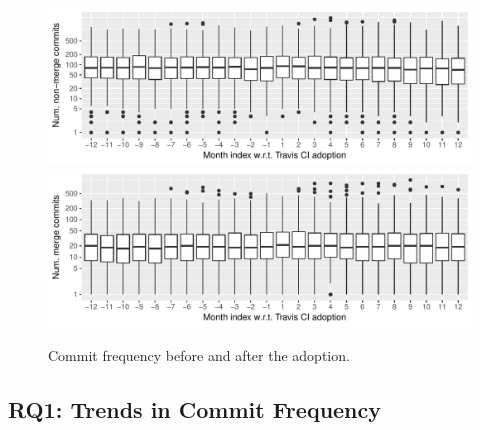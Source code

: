 \begin{figure}[t]
\centering
\includegraphics[width=\columnwidth, clip=true, trim=0 0 0 32]{figures/freq-non-merge.pdf}
\includegraphics[width=\columnwidth, clip=true, trim=0 0 0 0]{figures/freq-merge.pdf}
\caption{Commit frequency before and after the \Tvis adoption.}\vspace{-0.4cm}
\label{fig:freq}
\end{figure}


\subsection{RQ1: Trends in Commit Frequency}



